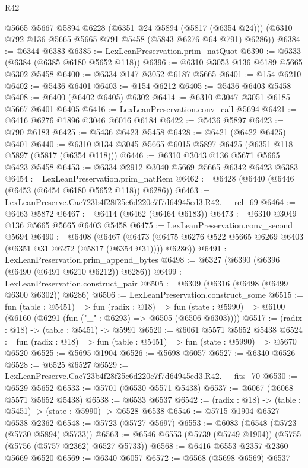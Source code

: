 \begin{lexlean}{R42}
\begin{coremodule}
      @5665
      @5667
      @5894
      @6228
      (@6351 @24 @5894 (@5817 (@6354 @24)))
      (@6310 @792 @136 @5665 @5665 @791 @5458 (@5843 @6276 @64 @791) @6286))
@6384 := @6344 @6383
@6385 := LexLeanPreservation.prim_natQuot
@6390 := @6333 (@6384 (@6385 @6180 @5652 @118))
@6396 := @6310 @3053 @136 @6189 @5665 @6302 @5458
@6400 := @6334 @147 @3052 @6187 @5665
@6401 := @154 @6210
@6402 := @5436 @6401
@6403 := @154 @6212
@6405 := @5436 @6403 @5458
@6408 := @6400 (@6402 @6405) @6302
@6414 := @6310 @3047 @3051 @6185 @5667 @6401 @6405
@6416 := LexLeanPreservation.conv_call @5694
@6421 := @6416 @6276 @1896 @3046 @6016 @6184
@6422 := @5436 @5897
@6423 := @790 @6183
@6425 := @5436 @6423 @5458
@6428 := @6421 (@6422 @6425) @6401
@6440 := @6310 @134 @3045 @5665 @6015 @5897 @6425 (@6351 @118 @5897 (@5817 (@6354 @118)))
@6446 := @6310 @3043 @136 @5671 @5665 @6423 @5458
@6453 := @6334 @2912 @3040 @5669 @5665 @6342 @6423 @6383
@6454 := LexLeanPreservation.prim_natRem
@6462 := @6428 (@6440 (@6446 (@6453 (@6454 @6180 @5652 @118)) @6286))
@6463 := LexLeanPreserve.Cae723b4f28f25c6d220e7f7d64945ed3.R42.__rel_69
@6464 := @6463 @5872
@6467 := @6414 (@6462 (@6464 @6183))
@6473 := @6310 @3049 @136 @5665 @5665 @6403 @5458
@6475 := LexLeanPreservation.conv_second @5694
@6490 := @6408
    (@6467 (@6473 (@6475 @6276 @522 @5665 @6269 @6403 (@6351 @31 @6272 (@5817 (@6354 @31)))) @6286))
@6491 := LexLeanPreservation.prim_append_bytes
@6498 := @6327 (@6390 (@6396 (@6490 (@6491 @6210 @6212)) @6286))
@6499 := LexLeanPreservation.construct_pair
@6505 := @6309 (@6316 (@6498 (@6499 @6300 @6302)) @6286)
@6506 := LexLeanPreservation.construct_some
@6515 := fun (table : @5451) =>
  fun (radix : @18) =>
  fun (state : @5990) => @6100 (@6160 (@6291 (fun ("_" : @6293) => @6505 (@6506 @6303))))
@6517 := (radix : @18) -> (table : @5451) -> @5991
@6520 := @6061 @5571 @5652 @5438
@6524 := fun (radix : @18) => fun (table : @5451) => fun (state : @5990) => @5670 @6520
@6525 := @5695 @1904
@6526 := @5698 @6057
@6527 := @6340 @6526
@6528 := @6525 @6527
@6529 := LexLeanPreserve.Cae723b4f28f25c6d220e7f7d64945ed3.R42.__fits_70
@6530 := @6529 @5652
@6533 := @5701 (@6530 @5571 @5438)
@6537 := @6067 (@6068 @5571 @5652 @5438)
@6538 := @6533 @6537
@6542 := (radix : @18) -> (table : @5451) -> (state : @5990) -> @6528 @6538
@6546 := @5715 @1904 @6527 @6538 @2362
@6548 := @5723 (@5727 @5697)
@6553 := @6083 (@6548 (@5723 (@5730 @5894) @5733))
@6563 := @6546 @6553 (@5739 (@5749 @1904)) (@5755 (@5756 (@5757 @2362) @6527 @5733))
@6568 := @6416 @6553 @2357 @2360 @5669 @6520
@6569 := @6340 @6057
@6572 := @6568 (@5698 @6569) @6537

\end{coremodule}
\end{lexlean}
